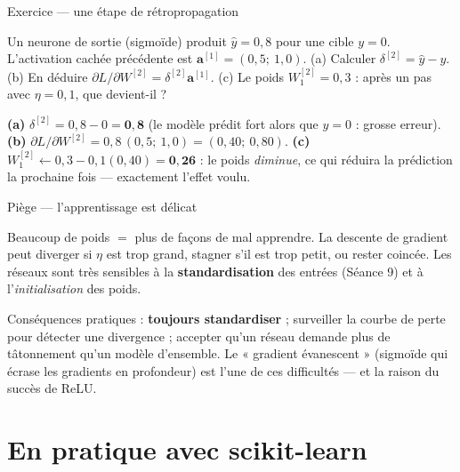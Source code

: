 \documentclass[aspectratio=169,11pt]{beamer}
\newcommand{\va}{\mathbf{a}}
\begin{document}
\begin{frame}{Exercice — une étape de rétropropagation}
\begin{ucadrec}[Énoncé]
{\small Un neurone de sortie (sigmoïde) produit $\hat y = 0{,}8$ pour une cible $y = 0$. L'activation cachée précédente est $\va^{[1]} = (0{,}5;\ 1{,}0)$. (a) Calculer $\delta^{[2]} = \hat y - y$. (b) En déduire $\partial L/\partial W^{[2]} = \delta^{[2]}\va^{[1]}$. (c) Le poids $W^{[2]}_1 = 0{,}3$ : après un pas avec $\eta = 0{,}1$, que devient-il ?}
\end{ucadrec}
\pause
\begin{ucadex}[Correction]
{\small \textbf{(a)} $\delta^{[2]} = 0{,}8 - 0 = \mathbf{0{,}8}$ (le modèle prédit fort alors que $y = 0$ : grosse erreur). \textbf{(b)} $\partial L/\partial W^{[2]} = 0{,}8\,(0{,}5;\ 1{,}0) = (0{,}40;\ 0{,}80)$. \textbf{(c)} $W^{[2]}_1 \leftarrow 0{,}3 - 0{,}1(0{,}40) = \mathbf{0{,}26}$ : le poids \emph{diminue}, ce qui réduira la prédiction la prochaine fois — exactement l'effet voulu.}
\end{ucadex}
\end{frame}

\begin{frame}{Piège — l'apprentissage est délicat}
\begin{ucadpiege}
{\small Beaucoup de poids $=$ plus de façons de mal apprendre. La descente de gradient peut diverger si $\eta$ est trop grand, stagner s'il est trop petit, ou rester coincée. Les réseaux sont très sensibles à la \textbf{standardisation} des entrées (Séance 9) et à l'\emph{initialisation} des poids.}
\end{ucadpiege}
{\small Conséquences pratiques : \textbf{toujours standardiser} ; surveiller la courbe de perte pour détecter une divergence ; accepter qu'un réseau demande plus de tâtonnement qu'un modèle d'ensemble. Le « gradient évanescent » (sigmoïde qui écrase les gradients en profondeur) est l'une de ces difficultés — et la raison du succès de ReLU.}
\end{frame}

\section{En pratique avec scikit-learn}
\end{document}
